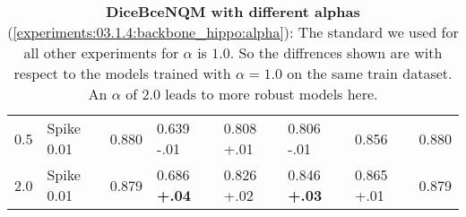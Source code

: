 \begin{table}[H]
\begin{tabular}{cl!{\vrule width 1.3pt}llllll}
        0.5 & Spike 0.01   & 0.880 & 0.639 -.01 & 0.808 +.01 & 0.806 -.01 & 0.856 & 0.880\\
        2.0 & Spike 0.01   & 0.879 & 0.686 \textbf{+.04} & 0.826 +.02 & 0.846 \textbf{+.03} & 0.865 +.01 & 0.879\\\bottomrule
    \end{tabular}
    \caption{\textbf{DiceBceNQM with different alphas} (\autoref{experiments:03.1.4:backbone_hippo:alpha}): The standard we used for all other experiments for $\alpha$ is $1.0$. So the diffrences shown are with respect to the models trained with $\alpha=1.0$ on the same train dataset.\\ 
    An $\alpha$ of $2.0$ leads to more robust models here.}
    \label{tab:3.1.4:alpha}
\end{table}